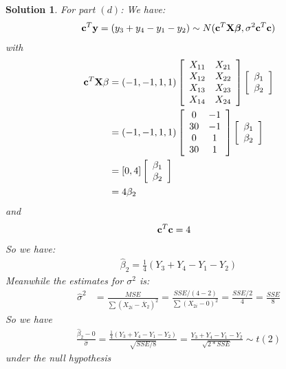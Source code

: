 \documentclass[11pt]{article}
\newtheorem{sol}{Solution}
\begin{document}
\begin{sol}
	For part $(d)$:\vskip 2mm
	We have:
	\begin{align*}
		{\bf c}^T{\bf y} = (y_3 + y_4 - y_1 - y_2) \sim N({\bf c}^T{\bf X}{\bm \beta}, \sigma^2{\bf c}^T{\bf c})
	\end{align*}
	with 
	\begin{align*}
		{\bf c}^T{\bf X}{\bf \beta} &= (-1, -1, 1, 1) \left[\begin{array}{cc} X_{11}& X_{21}\\ X_{12}& X_{22}\\ X_{13} &X_{23}\\ X_{14}&X_{24}\end{array}\right] \left[\begin{array}{c}\beta_1\\ \beta_2 \end{array}\right]\\
		&= (-1, -1, 1, 1) \left[\begin{array}{cc} 0& -1\\ 30& -1\\ 0 &1\\ 30&1\end{array}\right] \left[\begin{array}{c}\beta_1\\ \beta_2 \end{array}\right]\\
		&= [0, 4]\left[\begin{array}{c}\beta_1\\ \beta_2 \end{array}\right]\\
		&= 4\beta_2
	\end{align*}
	and 
	\begin{align*}
		{\bf c}^T{\bf c} &= 4
	\end{align*}
	So we have:
	\begin{align*}
		\hat{\beta}_2= \frac{1}{4}(Y_3 + Y_4 - Y_1 - Y_2)
	\end{align*}
	Meanwhile the estimates for $\sigma^2$ is:
	\begin{align*}
		\hat{\sigma}^2 &= \frac{MSE}{\sum (X_{2i} - \overline{X}_2)^2} = \frac{SSE/(4-2)}{\sum (X_{2i} - 0)^2} = \frac{SSE/2}{4} = \frac{SSE}{8}
	\end{align*}
	So we have
	\begin{align*}
		\frac{\hat{\beta}_2 -0}{\hat{\sigma}} = \frac{ \frac{1}{4}(Y_3 + Y_4 - Y_1 - Y_2)}{\sqrt{SSE/8}} = \frac{Y_3 + Y_4 - Y_1 - Y_2}{\sqrt{2\ast SSE}}\sim t(2)
	\end{align*}
	under the null hypothesis

\end{sol}
\end{document}
